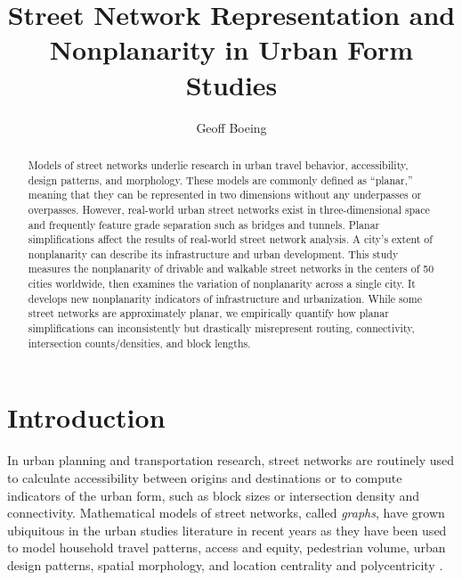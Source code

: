 \documentclass[Afour,sageh,times]{sagej}
\begin{document}
\title{Street Network Representation and Nonplanarity in Urban Form Studies}
\author{Geoff Boeing }


\begin{abstract}

Models of street networks underlie research in urban travel behavior, accessibility, design patterns, and morphology. These models are commonly defined as \enquote{planar,} meaning that they can be represented in two dimensions without any underpasses or overpasses. However, real-world urban street networks exist in three-dimensional space and frequently feature grade separation such as bridges and tunnels. Planar simplifications affect the results of real-world street network analysis. A city's extent of nonplanarity can describe its infrastructure and urban development. This study measures the nonplanarity of drivable and walkable street networks in the centers of 50 cities worldwide, then examines the variation of nonplanarity across a single city. It develops new nonplanarity indicators of infrastructure and urbanization. While some street networks are approximately planar, we empirically quantify how planar simplifications can inconsistently but drastically misrepresent routing, connectivity, intersection counts/densities, and block lengths.

\end{abstract}


\maketitle

\section{Introduction}

In urban planning and transportation research, street networks are routinely used to calculate accessibility between origins and destinations or to compute indicators of the urban form, such as block sizes or intersection density and connectivity. Mathematical models of street networks, called \emph{graphs}, have grown ubiquitous in the urban studies literature in recent years as they have been used to model household travel patterns, access and equity, pedestrian volume, urban design patterns, spatial morphology, and location centrality and polycentricity \citep{marshall_street_2010,porta_alterations_2014,marshall_community_2014,hajrasouliha_impact_2015,parthasarathi_street_2015,knight_metrics_2015,gil_street_2016,zhong_revealing_2017}.
\end{document}
